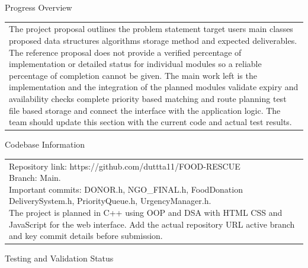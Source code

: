 \documentclass[12pt,a4paper]{article}
\newcommand{\sectiontitle}[1]{%
    {\color{GEUBlue}
    \fontsize{18}{22}\selectfont #1}
}
\newcommand{\answerbox}[2]{%
    \begin{tabularx}{\textwidth}{
        |>{\raggedright\arraybackslash}X|}
        \hline
        \parbox[t][#1][t]{\dimexpr\linewidth-12pt\relax}{
            \vspace{5pt}
            \fontsize{11}{13}\selectfont #2
        }\\
        \hline
    \end{tabularx}
}
\begin{document}
\vspace{0.75cm}

\sectiontitle{Progress Overview }

\vspace{0.05cm}

\vspace{0.25cm}

\answerbox{4.0cm}{The project proposal outlines the problem statement target users main classes proposed data structures algorithms storage method and expected deliverables. The reference proposal does not provide a verified percentage of implementation or detailed status for individual modules so a reliable percentage of completion cannot be given. The main work left is the implementation and the integration of the planned modules validate expiry and availability checks complete priority based matching and route planning test file based storage and connect the interface with the application logic. The team should update this section with the current code and actual test results. }

\newpage


\vspace*{0.20cm}

\sectiontitle{Codebase Information }

\vspace{0.05cm}

\vspace{0.20cm}

\answerbox{3.7cm}{Repository link: https://github.com/duttta11/FOOD-RESCUE\\[4pt]Branch: Main.\\[4pt]Important commits: DONOR.h, NGO\_FINAL.h, FoodDonation DeliverySystem.h, PriorityQueue.h, 
UrgencyManager.h.\\[4pt]The project is planned in C++ using OOP and DSA with HTML CSS and JavaScript for the web interface. Add the actual repository URL active branch and key commit details before submission.}

\vspace{0.65cm}

\sectiontitle{Testing and Validation Status }

\vspace{0.05cm}


\vspace{0.30cm}
\end{document}
